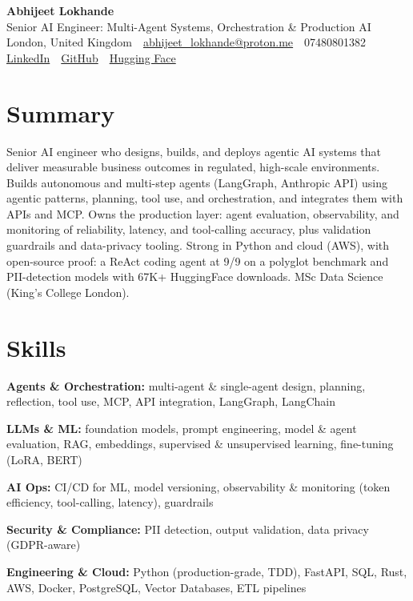 \documentclass[10pt,a4paper]{article}
\newcommand{\sep}{\,\textcolor{accent!60}{\textbar}\,}
\begin{document}
\begin{center}
  {\fontsize{24}{26}\selectfont\bfseries Abhijeet Lokhande}\\[3pt]
  {\color{accent}\large Senior AI Engineer: Multi-Agent Systems, Orchestration \& Production AI}\\[5pt]
  {\small
    London, United Kingdom \sep
    \href{mailto:abhijeet_lokhande@proton.me}{abhijeet\_lokhande@proton.me} \sep
    07480801382 \\[2pt]
    \href{https://www.linkedin.com/in/ablds/}{LinkedIn} \sep
    \href{https://github.com/abhijeetscode}{GitHub} \sep
    \href{https://huggingface.co/ab-ai}{Hugging Face}
  }
\end{center}
\vspace{2pt}

\section{Summary}
Senior AI engineer who designs, builds, and deploys agentic AI systems that deliver measurable business outcomes in regulated, high-scale environments. Builds autonomous and multi-step agents (LangGraph, Anthropic API) using agentic patterns, planning, tool use, and orchestration, and integrates them with APIs and MCP. Owns the production layer: agent evaluation, observability, and monitoring of reliability, latency, and tool-calling accuracy, plus validation guardrails and data-privacy tooling. Strong in Python and cloud (AWS), with open-source proof: a ReAct coding agent at 9/9 on a polyglot benchmark and PII-detection models with 67K+ HuggingFace downloads. MSc Data Science (King's College London).

\section{Skills}
\begin{tight}
  \item[\textcolor{accent}{\small$\bullet$}] \textbf{Agents \& Orchestration:} multi-agent \& single-agent design, planning, reflection, tool use, MCP, API integration, LangGraph, LangChain
  \item[\textcolor{accent}{\small$\bullet$}] \textbf{LLMs \& ML:} foundation models, prompt engineering, model \& agent evaluation, RAG, embeddings, supervised \& unsupervised learning, fine-tuning (LoRA, BERT)
  \item[\textcolor{accent}{\small$\bullet$}] \textbf{AI Ops:} CI/CD for ML, model versioning, observability \& monitoring (token efficiency, tool-calling, latency), guardrails
  \item[\textcolor{accent}{\small$\bullet$}] \textbf{Security \& Compliance:} PII detection, output validation, data privacy (GDPR-aware)
  \item[\textcolor{accent}{\small$\bullet$}] \textbf{Engineering \& Cloud:} Python (production-grade, TDD), FastAPI, SQL, Rust, AWS, Docker, PostgreSQL, Vector Databases, ETL pipelines
\end{tight}
\end{document}

